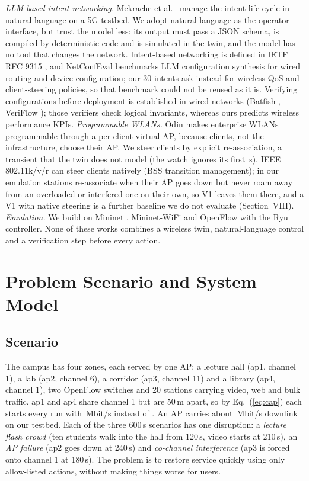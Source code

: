 \documentclass[conference]{IEEEtran}
\begin{document}
\emph{LLM-based intent networking.} Mekrache et al.\ \cite{mekrache2024} manage the intent life cycle in natural language on a 5G testbed. We adopt natural language as the operator interface, but trust the model less: its output must pass a JSON schema, is compiled by deterministic code and is simulated in the twin, and the model has no tool that changes the network. Intent-based networking is defined in IETF RFC 9315 \cite{clemm2022}, and NetConfEval \cite{wang2024} benchmarks LLM configuration synthesis for wired routing and device configuration; our 30 intents ask instead for wireless QoS and client-steering policies, so that benchmark could not be reused as it is. Verifying configurations before deployment is established in wired networks (Batfish \cite{fogel2015}, VeriFlow \cite{khurshid2013}); those verifiers check logical invariants, whereas ours predicts wireless performance KPIs.
\emph{Programmable WLANs.} Odin \cite{suresh2012} makes enterprise WLANs programmable through a per-client virtual AP, because clients, not the infrastructure, choose their AP. We steer clients by explicit re-association, a transient that the twin does not model (the watch ignores its first \CfgSettle\,s). IEEE 802.11k/v/r \cite{ieee80211} can steer clients natively (BSS transition management); in our emulation stations re-associate when their AP goes down but never roam away from an overloaded or interfered one on their own, so V1 leaves them there, and a V1 with native steering is a further baseline we do not evaluate (Section~VIII).
\emph{Emulation.} We build on Mininet \cite{lantz2010}, Mininet-WiFi \cite{fontes2015} and OpenFlow \cite{mckeown2008} with the Ryu controller.
None of these works combines a wireless twin, natural-language control and a verification step before every action.

\section{Problem Scenario and System Model}
\subsection{Scenario}
The campus has four zones, each served by one AP: a lecture hall (ap1, channel 1), a lab (ap2, channel 6), a corridor (ap3, channel 11) and a library (ap4, channel 1), two OpenFlow switches and 20 stations carrying video, web and bulk traffic. ap1 and ap4 share channel 1 but are 50\,m apart, so by Eq.~(\ref{eq:cap}) each starts every run with \CfgSharedCapacity\,Mbit/s instead of \CfgCapacity. An AP carries about \CfgCapacity\,Mbit/s downlink on our testbed. Each of the three 600\,s scenarios has one disruption: a \emph{lecture flash crowd} (ten students walk into the hall from 120\,s, video starts at 210\,s), an \emph{AP failure} (ap2 goes down at 240\,s) and \emph{co-channel interference} (ap3 is forced onto channel 1 at 180\,s). The problem is to restore service quickly using only allow-listed actions, without making things worse for users.
\end{document}
